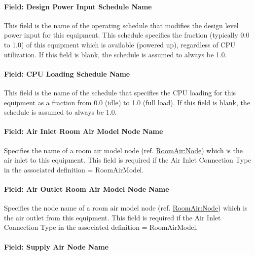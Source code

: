 \paragraph{Field: Design Power Input Schedule Name}\label{field-design-power-input-schedule-name-ite-instance}

This field is the name of the operating schedule that modifies the design level power input for this equipment. This schedule specifies the fraction (typically 0.0 to 1.0) of this equipment which is available (powered up), regardless of CPU utilization. If this field is blank, the schedule is assumed to always be 1.0.

\paragraph{Field: CPU Loading Schedule Name}\label{field-cpu-loading-schedule-name-ite-instance}

This field is the name of the schedule that specifies the CPU loading for this equipment as a fraction from 0.0 (idle) to 1.0 (full load). If this field is blank, the schedule is assumed to always be 1.0.

\paragraph{Field: Air Inlet Room Air Model Node Name}\label{field-air-inlet-room-air-model-node-name-ite-instance}

Specifies the name of a room air model node (ref. \hyperref[roomairnode]{RoomAir:Node}) which is the air inlet to this equipment. This field is required if the Air Inlet Connection Type in the associated definition = RoomAirModel.

\paragraph{Field: Air Outlet Room Air Model Node Name}\label{field-air-outlet-room-air-model-node-name-ite-instance}

Specifies the node name of a room air model node (ref. \hyperref[roomairnode]{RoomAir:Node}) which is the air outlet from this equipment. This field is required if the Air Inlet Connection Type in the associated definition = RoomAirModel.

\paragraph{Field: Supply Air Node Name}\label{field-supply-air-node-name-ite-instance}

